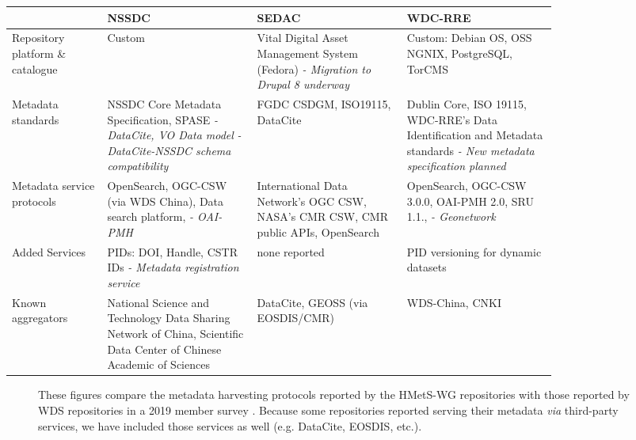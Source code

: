 \documentclass{interact}
\begin{document}
\begingroup
\setlength{\tabcolsep}{6pt} %
\renewcommand{\arraystretch}{1.5} %
\begin{sidewaystable}
{\begin{tabular}{p{0.14\linewidth} p{0.22\linewidth} p{0.22\linewidth} p{0.22\linewidth}}\\
& NSSDC & SEDAC & WDC-RRE\\\hline
Repository platform \newline \& catalogue & Custom & Vital Digital Asset Management System (Fedora) \newline \emph{- Migration to Drupal 8 underway} & Custom: Debian OS, OSS NGNIX, PostgreSQL, TorCMS \\
Metadata standards & NSSDC Core Metadata Specification, SPASE \newline \emph{- DataCite, VO Data model} \newline \emph{- DataCite-NSSDC schema compatibility} & FGDC CSDGM, ISO19115, DataCite & Dublin Core, ISO 19115, WDC-RRE’s Data Identification and Metadata standards \newline \emph{- New metadata specification planned}\\
Metadata service protocols & OpenSearch, OGC-CSW (via WDS China), Data search platform, \newline \emph{- OAI-PMH} & International Data Network's OGC CSW, NASA's CMR CSW, CMR public APIs, OpenSearch & OpenSearch, OGC-CSW 3.0.0, OAI-PMH 2.0, SRU 1.1., \newline \emph{- Geonetwork}\\
Added Services & PIDs: DOI, Handle, CSTR IDs \newline \emph{- Metadata registration service}& none reported & PID versioning for dynamic datasets\\
Known aggregators &  National Science and Technology Data Sharing Network of China, Scientific Data Center of Chinese Academic of Sciences  & DataCite, GEOSS (via EOSDIS/CMR) & WDS-China, CNKI\\
\bottomrule
\end{tabular}}
\label{summaryII}
\end{sidewaystable}
\endgroup

\begin{figure}
\centering
{}\hspace{5pt}
\caption{These figures compare the metadata harvesting protocols reported by the HMetS-WG repositories with those reported by WDS repositories in a 2019 member survey \parencite[11, 15]{payne_world_2020}. Because some repositories reported serving their metadata \emph{via} third-party services, we have included those services as well (e.g. DataCite, EOSDIS, etc.). } \label{wds-survey}
\end{figure}
\end{document}
